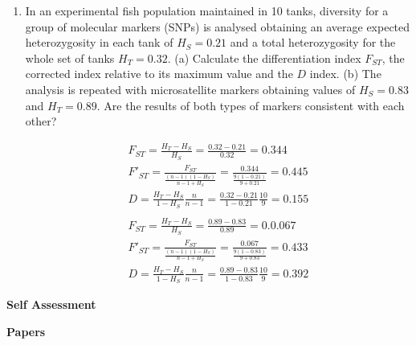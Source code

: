\documentclass[12pt]{amsart}
\begin{document}
\begin{enumerate}
\item In an experimental fish population maintained in 10 tanks, diversity for a group of molecular markers (SNPs) is analysed obtaining an average expected heterozygosity in each tank of $H_S = 0.21$ and a total heterozygosity for the whole set of tanks $H_T = 0.32$. (a) Calculate the differentiation index $F_{ST}$, the corrected index relative to its maximum value and the $D$ index. (b) The analysis is repeated with microsatellite markers obtaining values of $H_S = 0.83$ and $H_T = 0.89$. Are the results of both types of markers consistent with each other?

\begin{gather*}
F_{ST} = \frac{H_T - H_S}{H_S}= \frac{0.32 - 0.21}{0.32} = 0.344 \\
F'_{ST} = \frac{F_{ST}}{\frac{(n-1)(1-H_S)}{n-1+H_S}} = \frac{0.344}{\frac{9(1 - 0.21)}{9 + 0.21}} = 0.445\\
D =  \frac{H_T-H_S}{1-H_S}\frac{n}{n-1} = \frac{0.32 - 0.21}{1 - 0.21}\frac{10}{9} = 0.155\\
\\
F_{ST} = \frac{H_T - H_S}{H_S}= \frac{0.89 - 0.83}{0.89} = 0.0.067 \\
F'_{ST} = \frac{F_{ST}}{\frac{(n-1)(1-H_S)}{n-1+H_S}} = \frac{0.067}{\frac{9(1 - 0.83)}{9 + 0.83}} = 0.433\\
D =  \frac{H_T-H_S}{1-H_S}\frac{n}{n-1} = \frac{0.89-0.83}{1 - 0.83}\frac{10}{9} = 0.392
\end{gather*}

\end{enumerate}

{\large \bf Self Assessment}

{\large \bf Papers}
\end{document}
